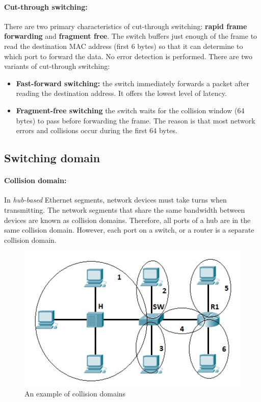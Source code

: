 \paragraph{Cut-through switching:}  There are two primary characteristics of cut-through switching: \textbf{rapid frame forwarding} and \textbf{fragment free}. The switch buffers just enough of the frame to read the destination MAC address (first 6 bytes) so that it can determine to which port to forward the data. No error detection is performed. There are two variants of cut-through switching: 

\begin{itemize}
\item \textbf{Fast-forward switching:} the switch immediately forwards a packet after reading the destination address. It offers the lowest level of latency. 

\item \textbf{Fragment-free switching} the switch waits for the collision window (64 bytes) to pass before forwarding the frame. The reason is that most network errors and collisions occur during the first 64 bytes. 
\end{itemize}

\subsection{Switching domain}

\paragraph{Collision domain:} In \emph{hub-based} Ethernet segments, network devices must take turns when transmitting. The network segments that share the same bandwidth between devices are known as collision domains. Therefore, all ports of a hub are in the same collision domain. However, each port on a switch, or a router is a separate collision domain.

\begin{figure}[hbtp]
\caption{An example of collision domains}
\centering
\includegraphics[scale=0.8]{pictures/CollisionDomains.jpg}
\end{figure}

